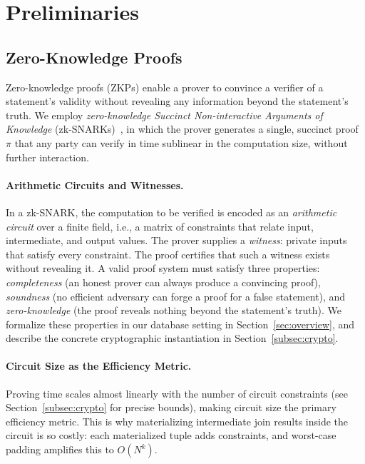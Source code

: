 \documentclass[sigconf]{acmart}
\renewcommand{\emph}[1]{\textit{#1}}
\begin{document}
\section{Preliminaries}
\label{sec:pre}

\subsection{Zero-Knowledge Proofs}
\label{sec:zkp-background}

Zero-knowledge proofs (ZKPs) enable a prover to convince a verifier of a statement's validity without revealing any information beyond the statement's truth. We employ \emph{zero-knowledge Succinct Non-interactive Arguments of Knowledge} (zk-SNARKs)~\cite{groth2016size,gabizon2019plonk}, in which the prover generates a single, succinct proof $\pi$ that any party can verify in time sublinear in the computation size, without further interaction. 

\vspace{-0.1in}
\paragraph{Arithmetic Circuits and Witnesses.}
In a zk-SNARK, the computation to be verified is encoded as an \emph{arithmetic circuit} over a finite field, i.e., a matrix of constraints that relate input, intermediate, and output values. The prover supplies a \emph{witness}: private inputs that satisfy every constraint. The proof certifies that such a witness exists without revealing it. A valid proof system must satisfy three properties: \emph{completeness} (an honest prover can always produce a convincing proof), \emph{soundness} (no efficient adversary can forge a proof for a false statement), and \emph{zero-knowledge} (the proof reveals nothing beyond the statement's truth). We formalize these properties in our database setting in Section~\ref{sec:overview}, and describe the concrete cryptographic instantiation in Section~\ref{subsec:crypto}.
\vspace{-0.1in}
\paragraph{Circuit Size as the Efficiency Metric.}
Proving time scales almost linearly with the number of circuit constraints (see Section~\ref{subsec:crypto} for precise bounds), making circuit size the primary efficiency metric. This is why materializing intermediate join results inside the circuit is so costly: each materialized tuple adds constraints, and worst-case padding amplifies this to $O(N^k)$.
\end{document}

